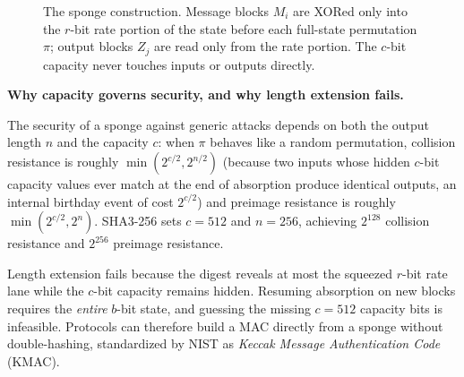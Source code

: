 \begin{figure}[htbp]
\caption{The sponge construction. Message blocks $M_i$ are XORed only into the $r$-bit rate portion of the state before each full-state permutation $\pi$; output blocks $Z_j$ are read only from the rate portion. The $c$-bit capacity never touches inputs or outputs directly.}
\label{ch14:fig-sponge}
\end{figure}

\begin{whybox}
\textbf{Why capacity governs security, and why length extension fails.}

The security of a sponge against generic attacks depends on both the output length $n$ and the capacity $c$: when $\pi$ behaves like a random permutation, collision resistance is roughly $\min(2^{c/2}, 2^{n/2})$ (because two inputs whose hidden $c$-bit capacity values ever match at the end of absorption produce identical outputs, an internal birthday event of cost $2^{c/2}$) and preimage resistance is roughly $\min(2^{c/2}, 2^{n})$. SHA3-256 sets $c = 512$ and $n = 256$, achieving $2^{128}$ collision resistance and $2^{256}$ preimage resistance.

Length extension fails because the digest reveals at most the squeezed $r$-bit rate lane while the $c$-bit capacity remains hidden. Resuming absorption on new blocks requires the \emph{entire} $b$-bit state, and guessing the missing $c = 512$ capacity bits is infeasible. Protocols can therefore build a MAC directly from a sponge without double-hashing, standardized by NIST as \emph{Keccak Message Authentication Code} (KMAC).
\end{whybox}

